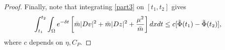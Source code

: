 \documentclass[10pt,a4paper]{amsart}
\newcommand{\di}{{\rm d}}
\begin{document}
\begin{proof}
		Finally, note that integrating \eqref{part3} on $[t_1,t_2]$ gives
		\begin{equation}\label{nuovaint}
		\int_{t_1}^{t_2} \int_{\Omega} e^{-\delta t} \left[\bar{m} |Dv|^2+  \bar{m} |Dz|^2+  \frac{\mu^2}{\bar{m}}\right] \di x \di t \le c [\tilde{\Phi}(t_1)-  \tilde{\Phi}(t_2)],
		\end{equation}
		where $c$ depends on $\eta, C_P$.
	\end{proof}
\end{document}

